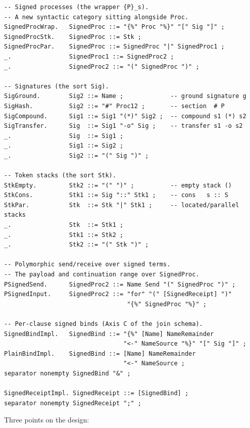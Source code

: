 \documentclass[11pt,a4paper]{article}
\begin{document}
\begin{lstlisting}[basicstyle=\small\ttfamily,frame=single,framesep=6pt,xleftmargin=1em,xrightmargin=1em]
-- Signed processes (the wrapper {P}_s).
-- A new syntactic category sitting alongside Proc.
SignedProcWrap.   SignedProc ::= "{%" Proc "%}" "[" Sig "]" ;
SignedProcStk.    SignedProc ::= Stk ;
SignedProcPar.    SignedProc ::= SignedProc "|" SignedProc1 ;
_.                SignedProc1 ::= SignedProc2 ;
_.                SignedProc2 ::= "(" SignedProc ")" ;

-- Signatures (the sort Sig).
SigGround.        Sig2 ::= Name ;             -- ground signature g
SigHash.          Sig2 ::= "#" Proc12 ;       -- section  # P
SigCompound.      Sig1 ::= Sig1 "(*)" Sig2 ;  -- compound s1 (*) s2
SigTransfer.      Sig  ::= Sig1 "-o" Sig ;    -- transfer s1 -o s2
_.                Sig  ::= Sig1 ;
_.                Sig1 ::= Sig2 ;
_.                Sig2 ::= "(" Sig ")" ;

-- Token stacks (the sort Stk).
StkEmpty.         Stk2 ::= "(" ")" ;          -- empty stack ()
StkCons.          Stk1 ::= Sig "::" Stk1 ;    -- cons   s :: S
StkPar.           Stk  ::= Stk "|" Stk1 ;     -- located/parallel stacks
_.                Stk  ::= Stk1 ;
_.                Stk1 ::= Stk2 ;
_.                Stk2 ::= "(" Stk ")" ;

-- Polymorphic send/receive over signed terms.
-- The payload and continuation range over SignedProc.
PSignedSend.      SignedProc2 ::= Name Send "(" SignedProc ")" ;
PSignedInput.     SignedProc2 ::= "for" "(" [SignedReceipt] ")"
                                  "{%" SignedProc "%}" ;

-- Per-clause signed binds (Axis C of the join schema).
SignedBindImpl.   SignedBind ::= "{%" [Name] NameRemainder
                                 "<-" NameSource "%}" "[" Sig "]" ;
PlainBindImpl.    SignedBind ::= [Name] NameRemainder
                                 "<-" NameSource ;
separator nonempty SignedBind "&" ;

SignedReceiptImpl. SignedReceipt ::= [SignedBind] ;
separator nonempty SignedReceipt ";" ;
\end{lstlisting}

\noindent
Three points on the design:
\end{document}
